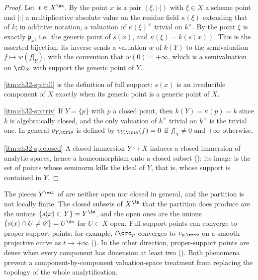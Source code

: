\begin{proof}
Let $x\in X^{\An}$.  By  the point $x$
is a pair $(\xi,|\cdot|)$ with $\xi\in X$ a scheme point and
$|\cdot|$ a multiplicative absolute value on the residue field
$\kappa(\xi)$ extending that of $k$; in additive notation, a valuation of
$\kappa(\xi)^\times$ trivial on $k^\times$.  By
 the point $\xi$ is exactly $\mathfrak p_x$,
i.e.\ the generic point of $s(x)$, and $\kappa(\xi)=k(s(x))$.  This is
the asserted bijection; its inverse sends a valuation $w$ of $k(Y)$ to
the semivaluation $f\mapsto w(f|_Y)$, with the convention that
$w(0)=+\infty$, which is a semivaluation on $\cO_X$ with support the
generic point of $Y$.

\cref{itm:ch32-sp:full} is the definition of full support:
$s(x)$ is an irreducible component of $X$ exactly when its generic point
is a generic point of $X$.

\cref{itm:ch32-sp:triv}  If $Y=\{p\}$ with $p$ a closed point, then
$k(Y)=\kappa(p)=k$ since $k$ is algebraically closed, and the only
valuation of $k^\times$ trivial on $k^\times$ is the trivial one.  In
general $v_{Y,\triv}$ is defined by $v_{Y,\triv}(f)=0$ if $f|_Y\neq0$
and $+\infty$ otherwise.

\cref{itm:ch32-sp:closed}  A closed immersion $Y\hookrightarrow X$ induces a
closed immersion of analytic spaces, hence a homeomorphism onto a closed
subset (); its image is the set of points whose
seminorm kills the ideal of $Y$, that is, whose support is contained in
$Y$.
\end{proof}

\begin{remark}
\label{rem:ch32-partition-not-open}
The pieces $Y^{\val}$ of  are neither
open nor closed in general, and the partition is not locally finite.  The
closed subsets of $X^{\An}$ that the partition does produce are the unions
$\{s(x)\subset Y\}=Y^{\An}$, and the open ones are the unions
$\{s(x)\cap U\neq\varnothing\}=U^{\An}$ for $U\subset X$ open.  Full-support points can converge to proper-support points: for example,
$t\ord_p$ converges to $v_{p,\triv}$ on a smooth projective curve as
$t\to+\infty$ ().  In the other direction,
proper-support points are dense when every component has dimension at least
two ().  Both phenomena prevent a
component-by-component valuation-space treatment from replacing the
topology of the whole analytification.
\end{remark}

